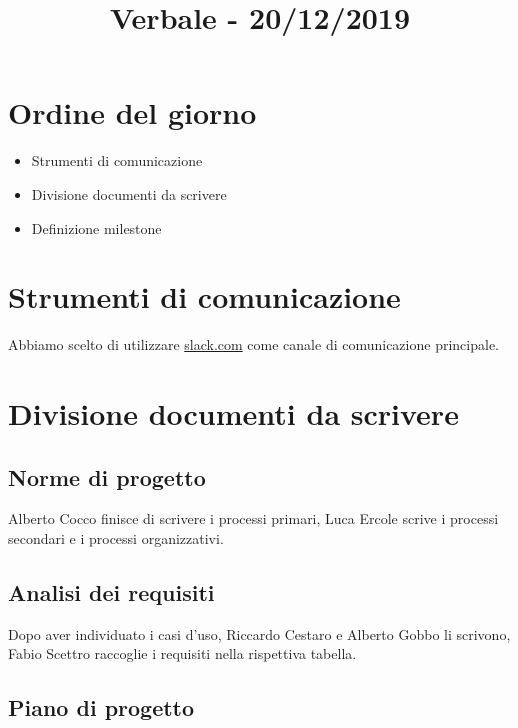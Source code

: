 \documentclass{article}
\title{Verbale - 20/12/2019} %
\newcommand{\commons}{../../commons}
\begin{document}

\section{Ordine del giorno}%
\label{sec:ordine_del_giorno}

\begin{itemize}
  \item Strumenti di comunicazione
  \item Divisione documenti da scrivere
  \item Definizione milestone
\end{itemize}

\section{Strumenti di comunicazione}%
\label{sec:strumenti_di_comunicazione}

Abbiamo scelto di utilizzare \href{Slack}{slack.com} come canale di comunicazione principale.

\section{Divisione documenti da scrivere}%
\label{sec:divisione_documenti_da_scrivere}

\subsection{Norme di progetto}%
\label{sub:norme_di_progetto}

Alberto Cocco finisce di scrivere i processi primari, Luca Ercole scrive i processi secondari e i processi organizzativi.

\subsection{Analisi dei requisiti}%
\label{sub:analisi_dei_requisiti}

Dopo aver individuato i casi d'uso, Riccardo Cestaro e Alberto Gobbo li scrivono, Fabio Scettro raccoglie i requisiti nella rispettiva tabella.

\subsection{Piano di progetto}%
\label{sub:piano_di_progetto}
\end{document}
